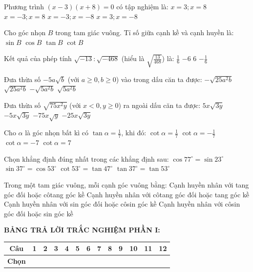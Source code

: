 \documentclass[12pt,a4paper]{article}
\begin{document}
\begin{ex}
Phương trình $(x - 3)(x + 8) = 0$ có tập nghiệm là:
\choice
{$x = 3; x = 8$}
{$x = -3; x = 8$}
{$x = -3; x = -8$}
{\True $x = 3; x = -8$}
\end{ex}

\begin{ex}
Cho góc nhọn $B$ trong tam giác vuông. Tỉ số giữa cạnh kề và cạnh huyền là:
\choice
{$\sin B$}
{\True $\cos B$}
{$\tan B$}
{$\cot B$}
\end{ex}

\begin{ex}
Kết quả của phép tính $\sqrt{-13} : \sqrt{-468}$ (hiểu là $\sqrt{\frac{13}{468}}$) là:
\choice
{\True $\frac{1}{6}$}
{$-6$}
{$6$}
{$-\frac{1}{6}$}
\end{ex}

\begin{ex}
Đưa thừa số $-5a\sqrt{b}$ (với $a \ge 0, b \ge 0$) vào trong dấu căn ta được:
\choice
{\True $-\sqrt{25a^2 b}$}
{$\sqrt{25a^2 b}$}
{$-\sqrt{5a^2 b}$}
{$\sqrt{5a^2 b}$}
\end{ex}

\begin{ex}
Đưa thừa số $\sqrt{75x^2 y}$ (với $x < 0, y \ge 0$) ra ngoài dấu căn ta được:
\choice
{$5x\sqrt{3y}$}
{\True $-5x\sqrt{3y}$}
{$-75x\sqrt{y}$}
{$-25x\sqrt{3y}$}
\end{ex}

\begin{ex}
Cho $\alpha$ là góc nhọn bất kì có $\tan \alpha = \frac{1}{7}$, khi đó:
\choice
{$\cot \alpha = \frac{1}{7}$}
{$\cot \alpha = -\frac{1}{7}$}
{$\cot \alpha = -7$}
{\True $\cot \alpha = 7$}
\end{ex}

\begin{ex}
Chọn khẳng định đúng nhất trong các khẳng định sau:
\choice
{$\cos 77^\circ = \sin 23^\circ$}
{\True $\sin 37^\circ = \cos 53^\circ$}
{$\cot 53^\circ = \tan 47^\circ$}
{$\tan 37^\circ = \tan 53^\circ$}
\end{ex}

\begin{ex}
Trong một tam giác vuông, mỗi cạnh góc vuông bằng:
\choice
{Cạnh huyền nhân với tang góc đối hoặc côtang góc kề}
{Cạnh huyền nhân với côtang góc đối hoặc tang góc kề}
{\True Cạnh huyền nhân với sin góc đối hoặc côsin góc kề}
{Cạnh huyền nhân với côsin góc đối hoặc sin góc kề}
\end{ex}


\vspace{1mm}
\noindent\textbf{BẢNG TRẢ LỜI TRẮC NGHIỆM PHẦN I:}
\begin{center}
\begin{tabular}{|c|c|c|c|c|c|c|c|c|c|c|c|c|}
\hline
\textbf{Câu} & \textbf{1} & \textbf{2} & \textbf{3} & \textbf{4} & \textbf{5} & \textbf{6} & \textbf{7} & \textbf{8} & \textbf{9} & \textbf{10} & \textbf{11} & \textbf{12} \\
\hline
\textbf{Chọn} & \rule{0pt}{0.65cm} & & & & & & & & & & & \\
\hline
\end{tabular}
\end{center}
\vspace{2mm}
\end{document}
